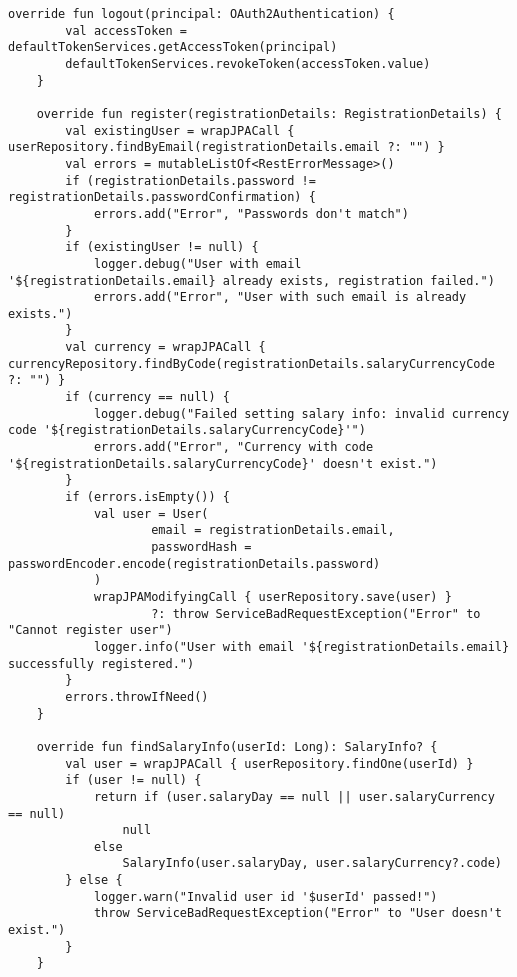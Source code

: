 \begin{lstlisting}[style = ktstyle]
    override fun logout(principal: OAuth2Authentication) {
        val accessToken = defaultTokenServices.getAccessToken(principal)
        defaultTokenServices.revokeToken(accessToken.value)
    }

    override fun register(registrationDetails: RegistrationDetails) {
        val existingUser = wrapJPACall { userRepository.findByEmail(registrationDetails.email ?: "") }
        val errors = mutableListOf<RestErrorMessage>()
        if (registrationDetails.password != registrationDetails.passwordConfirmation) {
            errors.add("Error", "Passwords don't match")
        }
        if (existingUser != null) {
            logger.debug("User with email '${registrationDetails.email} already exists, registration failed.")
            errors.add("Error", "User with such email is already exists.")
        }
        val currency = wrapJPACall { currencyRepository.findByCode(registrationDetails.salaryCurrencyCode ?: "") }
        if (currency == null) {
            logger.debug("Failed setting salary info: invalid currency code '${registrationDetails.salaryCurrencyCode}'")
            errors.add("Error", "Currency with code '${registrationDetails.salaryCurrencyCode}' doesn't exist.")
        }
        if (errors.isEmpty()) {
            val user = User(
                    email = registrationDetails.email,
                    passwordHash = passwordEncoder.encode(registrationDetails.password)
            )
            wrapJPAModifyingCall { userRepository.save(user) }
                    ?: throw ServiceBadRequestException("Error" to "Cannot register user")
            logger.info("User with email '${registrationDetails.email} successfully registered.")
        }
        errors.throwIfNeed()
    }

    override fun findSalaryInfo(userId: Long): SalaryInfo? {
        val user = wrapJPACall { userRepository.findOne(userId) }
        if (user != null) {
            return if (user.salaryDay == null || user.salaryCurrency == null)
                null
            else
                SalaryInfo(user.salaryDay, user.salaryCurrency?.code)
        } else {
            logger.warn("Invalid user id '$userId' passed!")
            throw ServiceBadRequestException("Error" to "User doesn't exist.")
        }
    }


\end{lstlisting}
